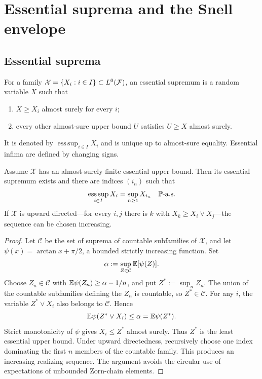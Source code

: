 \section{Essential suprema and the Snell envelope}

\subsection{Essential suprema}

\begin{definition}
For a family $\mathcal X=\{X_i:i\in I\}\subset L^0(\cF)$, an essential
supremum is a random variable $X$ such that
\begin{enumerate}[label=(\roman*)]
  \item $X\geq X_i$ almost surely for every $i$;
  \item every other almost-sure upper bound $U$ satisfies $U\geq X$ almost
        surely.
\end{enumerate}
It is denoted by $\operatorname*{ess\,sup}_{i\in I}X_i$ and is unique up to
almost-sure equality. Essential infima are defined by changing signs.
\end{definition}

\begin{theorem}
Assume $\mathcal X$ has an almost-surely finite essential upper bound. Then
its essential supremum exists and there are indices $(i_n)$ such that
\[
  \operatorname*{ess\,sup}_{i\in I}X_i
  =\sup_{n\geq1}X_{i_n}
  \quad\P\text{-a.s.}
\]
If $\mathcal X$ is upward directed---for every $i,j$ there is $k$ with
$X_k\geq X_i\vee X_j$---the sequence can be chosen increasing.
\end{theorem}

\begin{proof}
Let $\mathcal C$ be the set of suprema of countable subfamilies of
$\mathcal X$, and let $\psi(x)=\arctan x+\pi/2$, a bounded strictly increasing
function. Set
\[
  \alpha:=\sup_{Z\in\mathcal C}\E[\psi(Z)].
\]
Choose $Z_n\in\mathcal C$ with
$\E\psi(Z_n)\geq\alpha-1/n$, and put $Z^*:=\sup_n Z_n$. The union of the
countable subfamilies defining the $Z_n$ is countable, so $Z^*\in\mathcal C$.
For any $i$, the variable $Z^*\vee X_i$ also belongs to $\mathcal C$. Hence
\[
  \E\psi(Z^*\vee X_i)\leq\alpha=\E\psi(Z^*).
\]
Strict monotonicity of $\psi$ gives $X_i\leq Z^*$ almost surely. Thus $Z^*$ is
the least essential upper bound. Under upward directedness, recursively
choose one index dominating the first $n$ members of the countable family.
This produces an increasing realizing sequence. The argument avoids the
circular use of expectations of unbounded Zorn-chain elements.
\end{proof}

